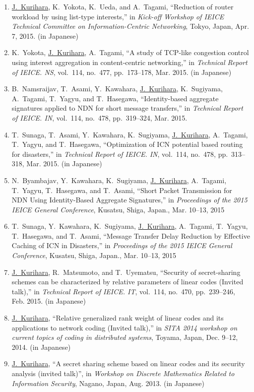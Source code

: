 \begin{enumerate}
 \item \underline{J.~Kurihara}, K.~Yokota, K.~Ueda, and A.~Tagami, ``Reduction of router workload by using list-type interests,'' in \textit{Kick-off Workshop of IEICE Technical Committee on Information-Centric Networking}, Tokyo, Japan, Apr. 7, 2015. (in Japanese)
 \item K.~Yokota, \underline{J.~Kurihara}, A.~Tagami, ``A study of TCP-like congestion control using interest aggregation in content-centric networking,'' in \textit{Technical Report of IEICE. NS}, vol.~114, no.~477, pp.~173--178, Mar. 2015. (in Japanese)
 \item B.~Namsraijav, T.~Asami, Y.~Kawahara, \underline{J.~Kurihara}, K.~Sugiyama, A.~Tagami, T.~Yagyu, and T.~Hasegawa, ``Identity-based aggregate signatures applied to NDN for short message transfers,'' in \textit{Technical Report of IEICE. IN}, vol.~114, no.~478, pp.~319--324, Mar. 2015.
 \item T.~Sunaga, T.~Asami, Y.~Kawahara, K.~Sugiyama, \underline{J.~Kurihara}, A.~Tagami, T.~Yagyu, and T.~Hasegawa, ``Optimization of ICN potential based routing for disasters,'' in \textit{Technical Report of IEICE. IN}, vol.~114, no.~478, pp.~313--318, Mar. 2015. (in Japanese)
 \item N.~Byambajav, Y.~Kawahara, K.~Sugiyama, \underline{J.~Kurihara}, A.~Tagami, T.~Yagyu, T.~Hasegawa, and T.~Asami, ``Short Packet Transmission for NDN Using Identity-Based Aggregate Signatures,'' in \textit{Proceedings of the 2015 IEICE General Conference}, Kusatsu, Shiga, Japan., Mar. 10--13, 2015
 \item T.~Sunaga, Y.~Kawahara, K.~Sugiyama, \underline{J.~Kurihara}, A.~Tagami, T.~Yagyu, T.~Hasegawa, and T.~Asami, ``Message Transfer Delay Reduction by Effective Caching of ICN in Disasters,'' in \textit{Proceedings of the 2015 IEICE General Conference}, Kusatsu, Shiga, Japan., Mar. 10--13, 2015
 \item \underline{J.~Kurihara}, R.~Matsumoto, and T.~Uyematsu, ``Security of secret-sharing schemes can be characterized by relative parameters of linear codes (Invited talk),'' in \textit{Technical Report of IEICE. IT}, vol.~114, no.~470, pp.~239--246, Feb. 2015. (in Japanese)
 \item \underline{J.~Kurihara}, ``Relative generalized rank weight of linear codes and its applications to network coding (Invited talk),'' in \textit{SITA 2014 workshop on current topics of coding in distributed systems}, Toyama, Japan, Dec. 9--12, 2014. (in Japanese)
 \item \underline{J.~Kurihara}, ``A secret sharing scheme based on linear codes and its security analysis (invited talk)'', in \textit{Workshop on Discrete Mathematics Related to Information Security}, Nagano, Japan, Aug. 2013. (in Japanese)

\end{enumerate}
